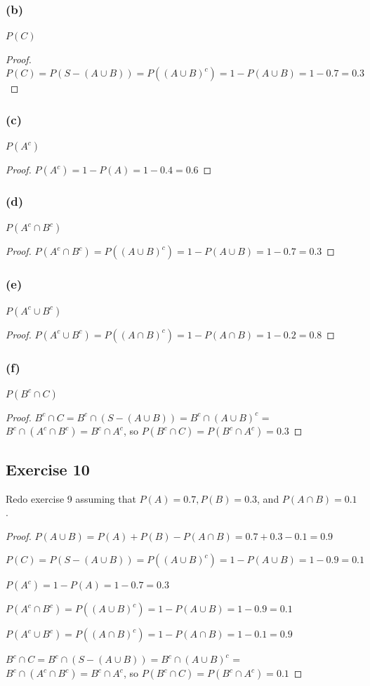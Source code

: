 \documentclass[14pt]{extarticle}
\begin{document}
\subsubsection{(b)}
\(P(C)\)
\begin{proof}
     \(P(C) = P(S - (A \cup B)) = P((A \cup B)^c) = 1 - P(A \cup B) = 1 - 0.7 = 0.3\)
\end{proof}

\subsubsection{(c)}
\(P(A^c)\)
\begin{proof}
     \(P(A^c) = 1 - P(A) = 1 - 0.4 = 0.6\)
\end{proof}

\subsubsection{(d)}
\(P(A^c \cap B^c)\)
\begin{proof}
     \(P(A^c \cap B^c) = P((A \cup B)^c) = 1 - P(A \cup B) = 1 - 0.7 = 0.3\)
\end{proof}

\subsubsection{(e)}
\(P(A^c \cup B^c)\)
\begin{proof}
     \(P(A^c \cup B^c) = P((A \cap B)^c) = 1 - P(A \cap B) = 1 - 0.2 = 0.8\)
\end{proof}

\subsubsection{(f)}
\(P(B^c \cap C)\)
\begin{proof}
     \(B^c \cap C = B^c \cap (S - (A \cup B)) = B^c \cap (A \cup B)^c\) = \(B^c \cap (A^c \cap B^c) = B^c \cap A^c\), so \(P(B^c \cap C) = P(B^c \cap A^c) = 0.3\)
\end{proof}

\subsection{Exercise 10}
Redo exercise 9 assuming that \(P(A) = 0.7, P(B) = 0.3\), and \(P(A \cap B) = 0.1\).

\begin{proof}
     \(P(A \cup B) = P(A) + P(B) - P(A \cap B) = 0.7 + 0.3 - 0.1 = 0.9\)

     \(P(C) = P(S - (A \cup B)) = P((A \cup B)^c) = 1 - P(A \cup B) = 1 - 0.9 = 0.1\)

     \(P(A^c) = 1 - P(A) = 1 - 0.7 = 0.3\)

     \(P(A^c \cap B^c) = P((A \cup B)^c) = 1 - P(A \cup B) = 1 - 0.9 = 0.1\)

     \(P(A^c \cup B^c) = P((A \cap B)^c) = 1 - P(A \cap B) = 1 - 0.1 = 0.9\)

     \(B^c \cap C = B^c \cap (S - (A \cup B)) = B^c \cap (A \cup B)^c\) = \(B^c \cap (A^c \cap B^c) = B^c \cap A^c\), so \(P(B^c \cap C) = P(B^c \cap A^c) = 0.1\)
\end{proof}
\end{document}
